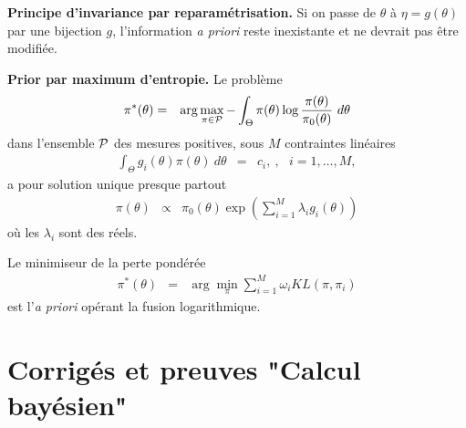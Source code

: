 \documentclass[10pt]{article}
\begin{document}
\begin{definition}{\bf Principe d'invariance par reparamétrisation.}\label{principe.invariance}
Si on passe de $\theta$ à $\eta=g(\theta)$ par une bijection $g$, l'information {\it a priori} reste inexistante et ne devrait pas être modifiée. 
\end{definition}


 
\fi

\if{} \vspace{1cm}
\begin{theorem}{\bf Prior par maximum d'entropie.}
Le problème
\begin{eqnarray*}
\textcolor{black}{\pi^*(\theta)} & = & \textcolor{black}{\arg\max\limits_{\pi\in{\cal{P}}} - \int_{\Theta} \pi(\theta) \log\frac{\pi(\theta)}{\pi_0(\theta)} \ d\theta} \label{maxent}
\end{eqnarray*}
dans l'ensemble ${\cal{P}}$ des mesures positives, sous $M$ contraintes  linéaires
\begin{eqnarray*}
\int_{\Theta} g_i(\theta) \pi(\theta) \ d\theta & = & c_i, \ ,\ \ \ i=1,\ldots,M,
\end{eqnarray*}
a pour solution unique presque partout
\begin{eqnarray*}
\pi(\theta) & \propto & \pi_0(\theta) \exp\left(\sum\limits_{i=1}^M \lambda_i g_i(\theta)\right)
\end{eqnarray*}
où les $\lambda_i$ sont des réels. 
\end{theorem}

 
\fi



\if{} \vspace{1cm}
\begin{proposition}
Le minimiseur de la perte pondérée
\begin{eqnarray*}
\pi^*(\theta) & = & \arg\min\limits_{\pi} \sum\limits_{i=1}^M  \omega_i KL(\pi,\pi_i)
\end{eqnarray*}
est l'{\it a priori} opérant la fusion logarithmique. 
\end{proposition}


 
\fi


 




\clearpage
\section{Corrigés et preuves "Calcul bayésien"}
\end{document}
